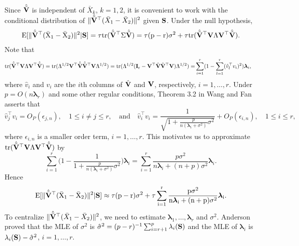 \documentclass[times,sort&compress,3p]{elsarticle}
\newcommand{\mytr}{\rm tr}
\newcommand{\myE}{\rm E}
\newcommand{\bfsym}[1]{\ensuremath{\boldsymbol{#1}}}
\def\blambda {\bfsym {\lambda}}        \def\bLambda {\bfsym {\Lambda}}
\theoremstyle{plain}
\theoremstyle{definition}
\theoremstyle{remark}
\begin{document}
Since $\hat{\tilde{\mathbf{V}}}$ is independent of $\bar{X}_k$, $k=1,2$, it is convenient to work with the conditional distribution of $\|\hat{\tilde{\mathbf{V}}}^\top  (\bar{X}_1-\bar{X}_2)\|^2$ given $\mathbf{S}$. 
Under the null hypothesis, 
\begin{equation*}
    \begin{aligned}
        \myE[ \|\hat{\tilde{\BV}}^\top  (\bar{X}_1-\bar{X}_2)\|^2 |\BS]
        =
\tau \mytr(\hat{\tilde{\BV}}^\top \bSigma\hat{\tilde{\BV}})
        =
\tau (p-r) \sigma^2+
\tau \mytr(\hat{\tilde{\BV}}^\top \BV \bLambda \BV^\top \hat{\tilde{\BV}}).%
    \end{aligned}
\end{equation*}
Note that
\begin{equation*}
\begin{aligned}
    \mytr(\hat{\tilde{\BV}}^\top \BV \bLambda \BV^\top \hat{\tilde{\BV}})
=
\mytr( \bLambda^{1/2} \BV^\top \hat{\tilde{\BV}}\hat{\tilde{\BV}}^\top \BV \bLambda^{1/2} )
=
\mytr( \bLambda^{1/2} (\BI_r-\BV^\top \hat{\BV}\hat{\BV}^\top \BV) \bLambda^{1/2} )
    =&
    \sum_{i=1}^r  (1-\sum_{l=1}^r (\hat{v}_l^\top  v_i)^2)\blambda_i,
\end{aligned}
\end{equation*}
where $\hat{v}_i$ and $v_i$ are the $i$th columns of $\hat{\mathbf{V}}$ and $\mathbf{V}$, respectively, $i=1,\ldots, r$.
Under $p=O(n\blambda_r)$ and some other regular conditions, Theorem 3.2 in Wang and Fan~\cite{Fan2015Asymptotics} asserts that 
\begin{equation}\label{yaofengla1}
\hat{v}_j^\top  v_i=O_P(\epsilon_{j,n}),\quad 1\leq i\neq j\leq r,
\quad \text{and}\quad
\hat{v}_i^\top  v_i=\frac{1}{\sqrt{1+ \frac{p}{n(\blambda_i+\sigma^2)}\sigma^2}}+O_P(\epsilon_{i,n}),\quad 1\leq i\leq r,
\end{equation}
where $\epsilon_{i,n}$ is a smaller order term, $i=1,\ldots, r$.
This motivates us to approximate $\mytr(\hat{\tilde{\BV}}^\top \BV \bLambda \BV^\top \hat{\tilde{\BV}})$
by
$$
\sum_{i=1}^r \Big(1-\frac{1}{1+\frac{p}{n(\blambda_i+\sigma^2)}\sigma^2}\Big)\blambda_i
=
\sum_{i=1}^r \frac{p\sigma^2}{n\blambda_i+(n+p)\sigma^2}\blambda_i.
$$
Hence 
$$
\myE [\|\hat{\tilde{\BV}}^\top  (\bar{X}_1-\bar{X}_2)\|^2|\BS]
\approx
\tau(p-r)\sigma^2 + \tau\sum_{i=1}^r \frac{p\sigma^2}{n\blambda_i+(n+p)\sigma^2}\blambda_i.
$$
To centralize $\|\hat{\tilde{\mathbf{V}}}^\top  (\bar{X}_1-\bar{X}_2)\|^2$, we need to estimate $\blambda_1,\ldots, \blambda_r$ and $\sigma^2$.
Anderson~\cite{Anderson1986Asymptotic} proved that the MLE of $\sigma^2$ is $\hat{\sigma}^2=(p-r)^{-1}\sum_{i=r+1}^p \lambda_i(\mathbf{S})$ and the MLE of $\blambda_i$ is $\lambda_i(\mathbf{S})-\hat{\sigma}^2$, $i=1,\ldots, r$.
\end{document}
